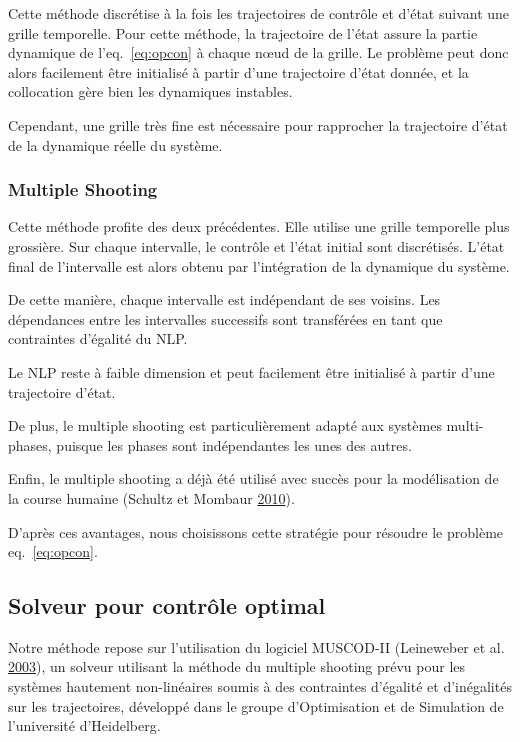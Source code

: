 \documentclass[french,A4paper,]{book}
\begin{document}
Cette méthode discrétise à la fois les trajectoires de contrôle et
d'état suivant une grille temporelle. Pour cette méthode, la trajectoire
de l'état assure la partie dynamique de l'eq.~\ref{eq:opcon} à chaque
nœud de la grille. Le problème peut donc alors facilement être
initialisé à partir d'une trajectoire d'état donnée, et la collocation
gère bien les dynamiques instables.

Cependant, une grille très fine est nécessaire pour rapprocher la
trajectoire d'état de la dynamique réelle du système.

\subsubsection{Multiple Shooting}\label{multiple-shooting}

Cette méthode profite des deux précédentes. Elle utilise une grille
temporelle plus grossière. Sur chaque intervalle, le contrôle et l'état
initial sont discrétisés. L'état final de l'intervalle est alors obtenu
par l'intégration de la dynamique du système.

De cette manière, chaque intervalle est indépendant de ses voisins. Les
dépendances entre les intervalles successifs sont transférées en tant
que contraintes d'égalité du NLP.

Le NLP reste à faible dimension et peut facilement être initialisé à
partir d'une trajectoire d'état.

De plus, le multiple shooting est particulièrement adapté aux systèmes
multi-phases, puisque les phases sont indépendantes les unes des autres.

Enfin, le multiple shooting a déjà été utilisé avec succès pour la
modélisation de la course humaine (Schultz et Mombaur
\protect\hyperlink{ref-schultz10}{2010}).

D'après ces avantages, nous choisissons cette stratégie pour résoudre le
problème eq.~\ref{eq:opcon}.

\subsection{Solveur pour contrôle
optimal}\label{solveur-pour-contruxf4le-optimal}

Notre méthode repose sur l'utilisation du logiciel MUSCOD-II (Leineweber
et al. \protect\hyperlink{ref-leineweber03}{2003}), un solveur utilisant
la méthode du multiple shooting prévu pour les systèmes hautement
non-linéaires soumis à des contraintes d'égalité et d'inégalités sur les
trajectoires, développé dans le groupe d'Optimisation et de Simulation
de l'université d'Heidelberg.
\end{document}

